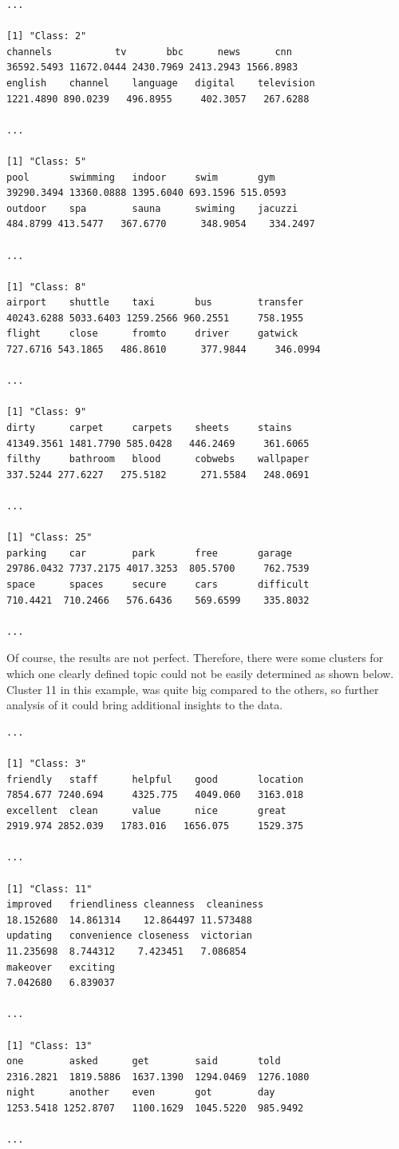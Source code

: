 \documentclass[11pt,openany,executivepaper]{book}
\begin{document}
\begin{verbatim}
...

[1] "Class: 2"
channels           tv       bbc      news      cnn        
36592.5493 11672.0444 2430.7969 2413.2943 1566.8983 
english    channel    language   digital    television 
1221.4890 890.0239   496.8955     402.3057   267.6288 

...

[1] "Class: 5"
pool       swimming   indoor     swim       gym        
39290.3494 13360.0888 1395.6040 693.1596 515.0593 
outdoor    spa        sauna      swiming    jacuzzi    
484.8799 413.5477   367.6770      348.9054    334.2497 

...

[1] "Class: 8"
airport    shuttle    taxi       bus        transfer   
40243.6288 5033.6403 1259.2566 960.2551     758.1955 
flight     close      fromto     driver     gatwick    
727.6716 543.1865   486.8610      377.9844     346.0994 

...

[1] "Class: 9"
dirty      carpet     carpets    sheets     stains     
41349.3561 1481.7790 585.0428   446.2469     361.6065 
filthy     bathroom   blood      cobwebs    wallpaper  
337.5244 277.6227   275.5182      271.5584   248.0691 

...

[1] "Class: 25"
parking    car        park       free       garage     
29786.0432 7737.2175 4017.3253  805.5700     762.7539 
space      spaces     secure     cars       difficult  
710.4421  710.2466   576.6436    569.6599    335.8032 

...
\end{verbatim}

Of course, the results are not perfect. Therefore, there were some clusters for which one clearly defined topic could not be easily determined as shown below. Cluster 11 in this example, was quite big compared to the others, so further analysis of it could bring additional insights to the data.

\begin{verbatim}
...

[1] "Class: 3"
friendly   staff      helpful    good       location   
7854.677 7240.694     4325.775   4049.060   3163.018 
excellent  clean      value      nice       great      
2919.974 2852.039   1783.016   1656.075     1529.375 

...

[1] "Class: 11"
improved   friendliness cleanness  cleaniness 
18.152680  14.861314    12.864497 11.573488 
updating   convenience closeness  victorian  
11.235698  8.744312    7.423451   7.086854 
makeover   exciting   
7.042680   6.839037 

...

[1] "Class: 13"
one        asked      get        said       told       
2316.2821  1819.5886  1637.1390  1294.0469  1276.1080 
night      another    even       got        day        
1253.5418 1252.8707   1100.1629  1045.5220  985.9492 

...
\end{verbatim}
\end{document}
